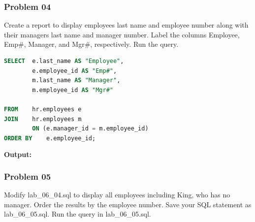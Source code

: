 \newpage
\subsubsection*{Problem 04}
Create a report to display employees last name and employee number along with their managers last name and manager number. Label the columns Employee, Emp\#, Manager, and Mgr\#, respectively. Run the query.

\begin{frame}



\begin{lstlisting}[language=SQL]
SELECT 	e.last_name AS "Employee",
		e.employee_id AS "Emp#",
		m.last_name AS "Manager",
		m.employee_id AS "Mgr#"
    
FROM	hr.employees e
JOIN	hr.employees m 
		ON (e.manager_id = m.employee_id)
ORDER BY	e.employee_id;
\end{lstlisting}
\textbf{Output: }
\end{frame}

\vspace{0.5cm}
\subsubsection*{Problem 05}
Modify lab\_06\_04.sql to display all employees including King, who has no manager. Order the results by the employee number. Save your SQL statement as lab\_06\_05.sql. Run the query in lab\_06\_05.sql.

